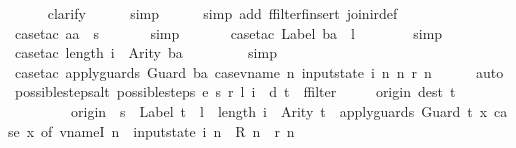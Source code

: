 \begin{isabellebody}
\ \ \ \ \isamarkupfalse%
\ clarify\isanewline
\ \ \ \ \isamarkupfalse%
\ simp\isanewline
\ \ \ \ \isamarkupfalse%
\ {\isacharparenleft}simp\ add{\isacharcolon}\ ffilter{\isacharunderscore}finsert\ join{\isacharunderscore}ir{\isacharunderscore}def{\isacharparenright}\isanewline
\ \ \ \ \isamarkupfalse%
\ {\isacharparenleft}case{\isacharunderscore}tac\ {\isachardoublequoteopen}aa\ {\isacharequal}\ s{\isachardoublequoteclose}{\isacharparenright}\isanewline
\ \ \ \ \ \isamarkupfalse%
\ simp\isanewline
\ \ \ \ \ \isamarkupfalse%
\ {\isacharparenleft}case{\isacharunderscore}tac\ {\isachardoublequoteopen}Label\ ba\ {\isacharequal}\ l{\isachardoublequoteclose}{\isacharparenright}\isanewline
\ \ \ \ \ \ \isamarkupfalse%
\ simp\isanewline
\ \ \ \ \ \ \isamarkupfalse%
\ {\isacharparenleft}case{\isacharunderscore}tac\ {\isachardoublequoteopen}length\ i\ {\isacharequal}\ Arity\ ba{\isachardoublequoteclose}{\isacharparenright}\isanewline
\ \ \ \ \ \ \ \isamarkupfalse%
\ simp\isanewline
\ \ \ \ \ \ \ \isamarkupfalse%
\ {\isacharparenleft}case{\isacharunderscore}tac\ {\isachardoublequoteopen}apply{\isacharunderscore}guards\ {\isacharparenleft}Guard\ ba{\isacharparenright}\ {\isacharparenleft}case{\isacharunderscore}vname\ {\isacharparenleft}{\isasymlambda}n{\isachardot}\ input{}state\ i\ n{\isacharparenright}\ {\isacharparenleft}{\isasymlambda}n{\isachardot}\ r\ n{\isacharparenright}{\isacharparenright}{\isachardoublequoteclose}{\isacharparenright}\isanewline
\ \ \ \ \isamarkupfalse%
\ auto\isanewline
{}\isamarkupfalse%
%
\endisatagproof
{\isafoldproof}%
%
\isadelimproof
\isanewline
%
\endisadelimproof
\isanewline
{}\isamarkupfalse%
\ possible{\isacharunderscore}steps{\isacharunderscore}alt{\isacharcolon}\ {\isachardoublequoteopen}{\isacharparenleft}possible{\isacharunderscore}steps\ e\ s\ r\ l\ i\ {\isacharequal}\ {\isacharbraceleft}{\isacharbar}{\isacharparenleft}d{\isacharcomma}\ t{\isacharparenright}{\isacharbar}{\isacharbraceright}{\isacharparenright}\ {\isacharequal}\ {\isacharparenleft}ffilter\isanewline
\ \ \ \ \ {\isacharparenleft}{\isasymlambda}{\isacharparenleft}{\isacharparenleft}origin{\isacharcomma}\ dest{\isacharparenright}{\isacharcomma}\ t{\isacharparenright}{\isachardot}\isanewline
\ \ \ \ \ \ \ \ \ origin\ {\isacharequal}\ s\ {\isasymand}\ Label\ t\ {\isacharequal}\ l\ {\isasymand}\ length\ i\ {\isacharequal}\ Arity\ t\ {\isasymand}\ apply{\isacharunderscore}guards\ {\isacharparenleft}Guard\ t{\isacharparenright}\ {\isacharparenleft}{\isasymlambda}x{\isachardot}\ case\ x\ of\ vname{\isachardot}I\ n\ {\isasymRightarrow}\ input{}state\ i\ n\ {\isacharbar}\ R\ n\ {\isasymRightarrow}\ r\ n{\isacharparenright}{\isacharparenright}\isanewline

\end{isabellebody}

